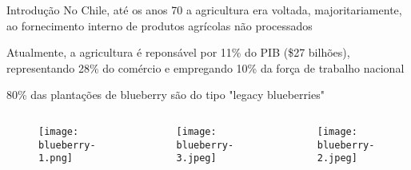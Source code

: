 \begin{frame}[t]{Introdução} 
    \newcommand\vspaceintro{0.2cm}
    \transdissolve[duration=0.5]
    No Chile, até os anos 70 a agricultura era voltada, majoritariamente, ao fornecimento interno de produtos agrícolas não processados \cite{blueberryrecognition}\vspace{\vspaceintro}
    
    Atualmente, a agricultura é reponsável por 11\% do PIB (\$27 bilhões), representando 28\% do comércio e empregando 10\% da força de trabalho nacional\cite{ChilePIB:online} \vspace{\vspaceintro} 

    80\% das plantações de blueberry são do tipo "legacy blueberries"
    \vspace{-0.4cm}
    \begin{columns}[t]
        \begin{center}
                \begin{figure}
                    \texttt{[image: blueberry-1.png]}
                \end{figure}
        \end{center}

        \begin{center}
                \begin{figure}
                    \texttt{[image: blueberry-3.jpeg]}
                \end{figure}
        \end{center}

        \begin{center}
                \begin{figure}
                    \texttt{[image: blueberry-2.jpeg]}
                \end{figure}
        \end{center}

    \end{columns}
\end{frame}

